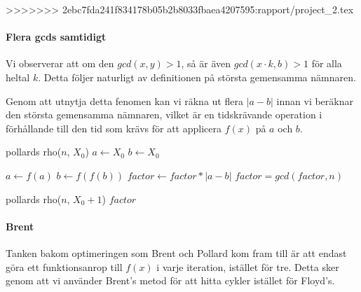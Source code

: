 \documentclass[a4paper,12pt]{article}
\renewcommand{\*}{\ensuremath{\cdot}}
\begin{document}
>>>>>>> 2ebc7fda241f834178b05b2b8033fbaea4207595:rapport/project_2.tex

\paragraph{Flera gcds samtidigt}

Vi observerar att om den $gcd(x, y) > 1$, så är även $gcd(x\cdot k, b)>1$ för alla heltal $k$. Detta följer naturligt av definitionen på största gemensamma nämnaren.

Genom att utnytja detta fenomen kan vi räkna ut flera $|a-b|$ innan vi beräknar den största gemensamma nämnaren, vilket är en tidskrävande operation i förhållande till den tid som krävs för att applicera $f(x)$ på $a$ och $b$.

\begin{algorithmic}
    \STATE pollards rho($n$, $X_0$)
        \STATE $a \gets X_0 $
        \STATE $b \gets X_0 $

                \STATE $a \gets f(a)$
                \STATE $b \gets f(f(b))$
                \STATE $factor \gets factor * |a-b|$
            \ENDFOR
            \STATE $factor = gcd(factor, n)$
        \ENDWHILE

            \STATE {}
            \RETURN pollards rho($n$, $X_0+1$) 
            \RETURN $factor$
        \ENDIF
\end{algorithmic}

\paragraph{Brent}

Tanken bakom optimeringen som Brent och Pollard kom fram till är att endast göra ett funktionsanrop till $f(x)$ i varje iteration, istället för tre. Detta sker genom att vi använder Brent's metod för att hitta cykler istället för Floyd's. 
\end{document}
